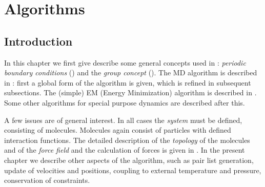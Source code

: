 %
% 
% 
% 
% 
% 
% 
% 
% 
%

\newcommand{\nproc}{\mbox{$M$}}
\newcommand{\natom}{\mbox{$N$}}
\newcommand{\nx}{\mbox{$n_x$}}
\newcommand{\ny}{\mbox{$n_y$}}
\newcommand{\nz}{\mbox{$n_z$}}
\newcommand{\nsgrid}{NS grid}
\newcommand{\fftgrid}{FFT grid}
\newcommand{\dgrid}{\mbox{$\delta_{grid}$}}
\newcommand{\bfv}[1]{{\mbox{\boldmath{$#1$}}}}
\newcommand{\bfm}[1]{{\bf #1}}
\newcommand{\dt}{\Delta t}
\newcommand{\rv}{\bfv{r}}
\newcommand{\vv}{\bfv{v}}
\newcommand{\F}{\bfv{F}}
\newcommand{\pb}{\bfv{p}}
\newcommand{\veps}{v_{\epsilon}}
\newcommand{\peps}{p_{\epsilon}}
\newcommand{\sinhx}[1]{\frac{\sinh{\left( #1\right)}}{#1}}
\chapter{Algorithms}
\label{ch:algorithms}
\section{Introduction}
In this chapter we first give describe some general concepts used in
{\gromacs}:  {\em periodic boundary conditions} ()
and the {\em group concept} (). The MD algorithm is
described in : first a global form of the algorithm is
given, which is refined in subsequent subsections. The (simple) EM
(Energy Minimization) algorithm is described in . Some
other algorithms for special purpose dynamics are described after
this.  


A few issues are of general interest. In all cases the {\em system}
must be defined, consisting of molecules. Molecules again consist of
particles  with defined interaction functions. The detailed
description of the {\em topology} of the molecules and of the {\em force
field} and the calculation of forces is given in
. In the present chapter we describe
other aspects of the algorithm, such as pair list generation, update of
velocities  and positions, coupling to external temperature and
pressure,  conservation of constraints. 

